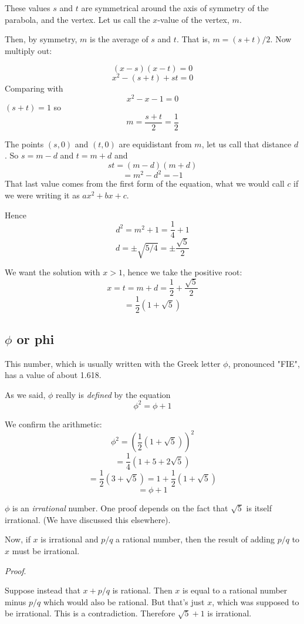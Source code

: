 \documentclass[11pt, oneside]{article}
\begin{document}
These values $s$ and $t$ are symmetrical around the axis of symmetry of the parabola, and the vertex.  Let us call the $x$-value of the vertex, $m$.  

Then, by symmetry, $m$ is the average of $s$ and $t$.  That is, $m = (s + t)/2$.  Now multiply out:

\[ (x - s)(x - t) = 0 \]
\[ x^2 - (s + t) + st = 0 \]
Comparing with
\[ x^2 - x - 1 = 0 \]
$(s + t) = 1$ so
\[ m = \frac{s + t}{2} = \frac{1}{2} \]

The points $(s,0)$ and $(t,0)$ are equidistant from $m$, let us call that distance $d$.  So $s = m - d$ and $t = m + d$ and 
\[ st = (m - d)(m + d) \]
\[ = m^2 - d^2 = -1 \]
That last value comes from the first form of the equation, what we would call $c$ if we were writing it as $ax^2 + bx + c$.

Hence 
\[ d^2 = m^2 + 1 = \frac{1}{4} + 1 \]
\[ d = \pm \sqrt{5/4} = \pm \frac{\sqrt{5}}{2} \]

We want the solution with $x > 1$, hence we take the positive root:
\[ x = t = m + d = \frac{1}{2} + \frac{\sqrt{5}}{2} \]
\[ = \frac{1}{2} (1 + \sqrt{5}) \]

\subsection*{$\phi$ or phi}

This number, which is usually written with the Greek letter $\phi$, pronounced "FIE", has a value of about 1.618.

As we said, $\phi$ really is \emph{defined} by the equation
\[ \phi^2 = \phi + 1 \]

We confirm the arithmetic:
\[ \phi^2 = (\frac{1}{2} (1 + \sqrt{5}))^2 \]
\[ = \frac{1}{4} (1 + 5 + 2 \sqrt{5}) \]
\[ =  \frac{1}{2} (3 + \sqrt{5}) = 1 +  \frac{1}{2} (1 + \sqrt{5}) \]
\[ = \phi + 1 \] 

$\phi$ is an \emph{irrational} number.  One proof depends on the fact that $\sqrt{5}$ is itself irrational.  (We have discussed this elsewhere).

Now, if $x$ is irrational and $p/q$ a rational number, then the result of adding $p/q$ to $x$ must be irrational.  

\emph{Proof}.  

Suppose instead that $x + p/q$ is rational.  Then $x$ is equal to a rational number minus $p/q$ which would also be rational.  But that's just $x$, which was supposed to be irrational.  This is a contradiction.  Therefore $\sqrt{5} + 1$ is irrational.  
\end{document}
